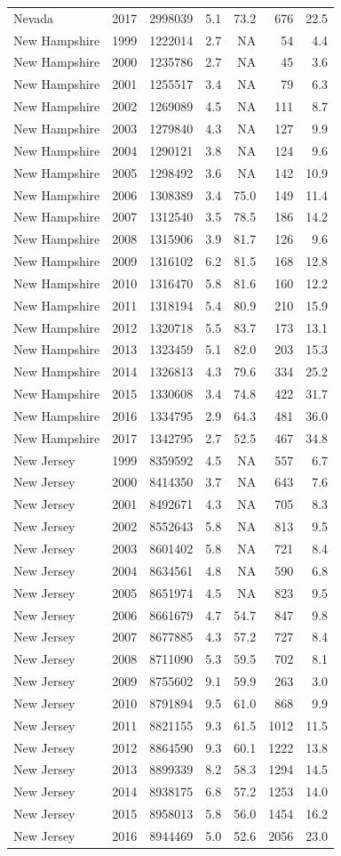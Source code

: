 \documentclass[
]{article}
\begin{document}
\begin{longtable}[]{@{}lrrrrrr@{}}
Nevada & 2017 & 2998039 & 5.1 & 73.2 & 676 & 22.5\tabularnewline
New Hampshire & 1999 & 1222014 & 2.7 & NA & 54 & 4.4\tabularnewline
New Hampshire & 2000 & 1235786 & 2.7 & NA & 45 & 3.6\tabularnewline
New Hampshire & 2001 & 1255517 & 3.4 & NA & 79 & 6.3\tabularnewline
New Hampshire & 2002 & 1269089 & 4.5 & NA & 111 & 8.7\tabularnewline
New Hampshire & 2003 & 1279840 & 4.3 & NA & 127 & 9.9\tabularnewline
New Hampshire & 2004 & 1290121 & 3.8 & NA & 124 & 9.6\tabularnewline
New Hampshire & 2005 & 1298492 & 3.6 & NA & 142 & 10.9\tabularnewline
New Hampshire & 2006 & 1308389 & 3.4 & 75.0 & 149 & 11.4\tabularnewline
New Hampshire & 2007 & 1312540 & 3.5 & 78.5 & 186 & 14.2\tabularnewline
New Hampshire & 2008 & 1315906 & 3.9 & 81.7 & 126 & 9.6\tabularnewline
New Hampshire & 2009 & 1316102 & 6.2 & 81.5 & 168 & 12.8\tabularnewline
New Hampshire & 2010 & 1316470 & 5.8 & 81.6 & 160 & 12.2\tabularnewline
New Hampshire & 2011 & 1318194 & 5.4 & 80.9 & 210 & 15.9\tabularnewline
New Hampshire & 2012 & 1320718 & 5.5 & 83.7 & 173 & 13.1\tabularnewline
New Hampshire & 2013 & 1323459 & 5.1 & 82.0 & 203 & 15.3\tabularnewline
New Hampshire & 2014 & 1326813 & 4.3 & 79.6 & 334 & 25.2\tabularnewline
New Hampshire & 2015 & 1330608 & 3.4 & 74.8 & 422 & 31.7\tabularnewline
New Hampshire & 2016 & 1334795 & 2.9 & 64.3 & 481 & 36.0\tabularnewline
New Hampshire & 2017 & 1342795 & 2.7 & 52.5 & 467 & 34.8\tabularnewline
New Jersey & 1999 & 8359592 & 4.5 & NA & 557 & 6.7\tabularnewline
New Jersey & 2000 & 8414350 & 3.7 & NA & 643 & 7.6\tabularnewline
New Jersey & 2001 & 8492671 & 4.3 & NA & 705 & 8.3\tabularnewline
New Jersey & 2002 & 8552643 & 5.8 & NA & 813 & 9.5\tabularnewline
New Jersey & 2003 & 8601402 & 5.8 & NA & 721 & 8.4\tabularnewline
New Jersey & 2004 & 8634561 & 4.8 & NA & 590 & 6.8\tabularnewline
New Jersey & 2005 & 8651974 & 4.5 & NA & 823 & 9.5\tabularnewline
New Jersey & 2006 & 8661679 & 4.7 & 54.7 & 847 & 9.8\tabularnewline
New Jersey & 2007 & 8677885 & 4.3 & 57.2 & 727 & 8.4\tabularnewline
New Jersey & 2008 & 8711090 & 5.3 & 59.5 & 702 & 8.1\tabularnewline
New Jersey & 2009 & 8755602 & 9.1 & 59.9 & 263 & 3.0\tabularnewline
New Jersey & 2010 & 8791894 & 9.5 & 61.0 & 868 & 9.9\tabularnewline
New Jersey & 2011 & 8821155 & 9.3 & 61.5 & 1012 & 11.5\tabularnewline
New Jersey & 2012 & 8864590 & 9.3 & 60.1 & 1222 & 13.8\tabularnewline
New Jersey & 2013 & 8899339 & 8.2 & 58.3 & 1294 & 14.5\tabularnewline
New Jersey & 2014 & 8938175 & 6.8 & 57.2 & 1253 & 14.0\tabularnewline
New Jersey & 2015 & 8958013 & 5.8 & 56.0 & 1454 & 16.2\tabularnewline
New Jersey & 2016 & 8944469 & 5.0 & 52.6 & 2056 & 23.0\tabularnewline

\end{longtable}
\end{document}
